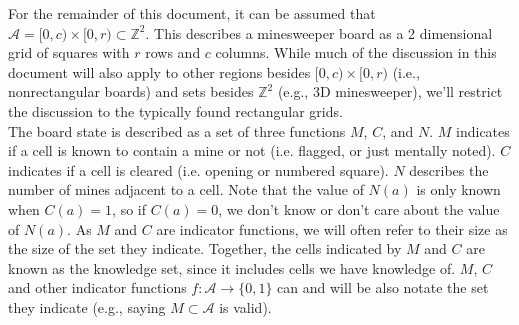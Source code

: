For the remainder of this document, it can be assumed that $\mathcal{A}=[0,c)\times[0,r)\subset\mathbb{Z}^2$. This describes a minesweeper board as a 2 dimensional grid of squares with $r$ rows and $c$ columns. While much of the discussion in this document will also apply to other regions besides $[0,c)\times[0,r)$ (i.e., nonrectangular boards) and sets besides $\mathbb{Z}^2$ (e.g., 3D minesweeper), we'll restrict the discussion to the typically found rectangular grids.\\ 

The board state is described as a set of three functions $M$, $C$, and $N$. $M$ indicates if a cell is known to contain a mine or not (i.e. flagged, or just mentally noted). $C$ indicates if a cell is cleared (i.e. opening or numbered square). $N$ describes the number of mines adjacent to a cell. Note that the value of $N(a)$ is only known when $C(a)=1$, so if $C(a)=0$, we don't know or don't care about the value of $N(a)$. As $M$ and $C$ are indicator functions, we will often refer to their size as the size of the set they indicate. Together, the cells indicated by $M$ and $C$ are known as the knowledge set, since it includes cells we have knowledge of. $M$, $C$ and other indicator functions $f:\mathcal{A}\to\{0,1\}$ can and will be also notate the set they indicate (e.g., saying $M\subset\mathcal{A}$ is valid).\\

